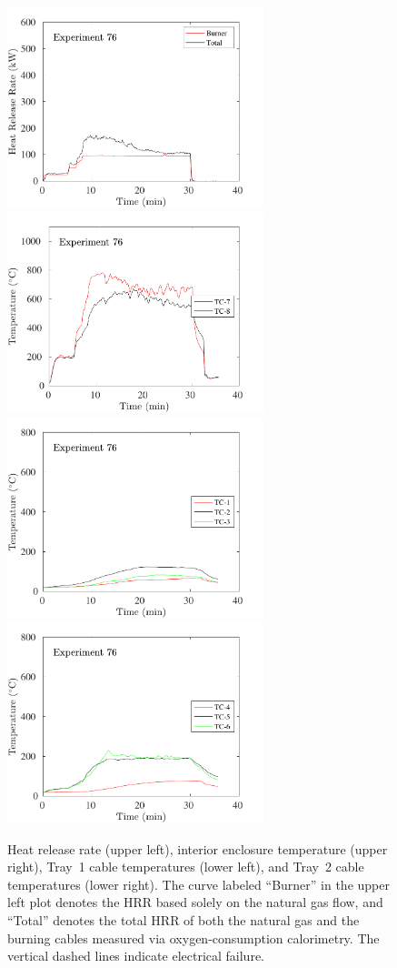 \begin{figure}[H]
\includegraphics[height=2.30in]{../SCRIPT_FIGURES/Test_76_HRR} \hfill
\includegraphics[height=2.30in]{../SCRIPT_FIGURES/Test_76_TC_7-8} \\
\includegraphics[height=2.30in]{../SCRIPT_FIGURES/Test_76_TC_1-3} \hfill
\includegraphics[height=2.30in]{../SCRIPT_FIGURES/Test_76_TC_4-6}
\caption[HRR and temperatures of Exp.~76]{Heat release rate (upper left), interior enclosure temperature (upper right), Tray~1 cable temperatures (lower left), and Tray~2 cable temperatures (lower right). The curve labeled ``Burner'' in the upper left plot denotes the HRR based solely on the natural gas flow, and ``Total'' denotes the total HRR of both the natural gas and the burning cables measured via oxygen-consumption calorimetry. The vertical dashed lines indicate electrical failure.}
\label{fig:Test_76}
\end{figure}

